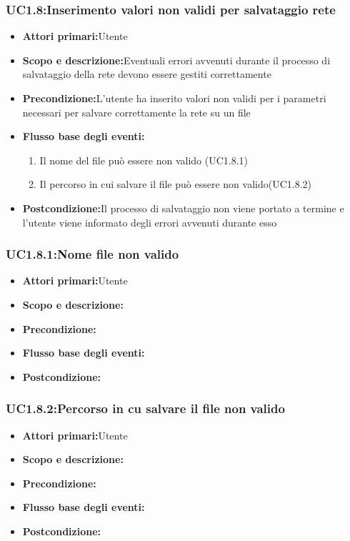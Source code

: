 \subsubsection{UC1.8:Inserimento valori non validi per salvataggio rete}
\begin{itemize}
	\item{\textbf{Attori primari:}Utente}
	\item{\textbf{Scopo e descrizione:}Eventuali errori avvenuti durante il processo di salvataggio della rete devono essere gestiti correttamente}
	\item{\textbf{Precondizione:}L'utente ha inserito valori non validi per i parametri necessari per salvare correttamente la rete su un file}
	\item{\textbf{Flusso base degli eventi:}}
	\begin{enumerate}
		\item{Il nome del file può essere non valido (UC1.8.1)}
		\item{Il percorso in cui salvare il file può essere non valido(UC1.8.2)}
	\end{enumerate}
	\item{\textbf{Postcondizione:}Il processo di salvataggio non viene portato a termine e l'utente viene informato degli errori avvenuti durante esso}
\end{itemize}
\subsubsection{UC1.8.1:Nome file non valido}
\begin{itemize}
	\item{\textbf{Attori primari:}Utente}
	\item{\textbf{Scopo e descrizione:}}
	\item{\textbf{Precondizione:}}
	\item{\textbf{Flusso base degli eventi:}}
	\item{\textbf{Postcondizione:}}
\end{itemize}
\subsubsection{UC1.8.2:Percorso in cu salvare il file non valido}
\begin{itemize}
	\item{\textbf{Attori primari:}Utente}
	\item{\textbf{Scopo e descrizione:}}
	\item{\textbf{Precondizione:}}
	\item{\textbf{Flusso base degli eventi:}}
	\item{\textbf{Postcondizione:}}
\end{itemize}
